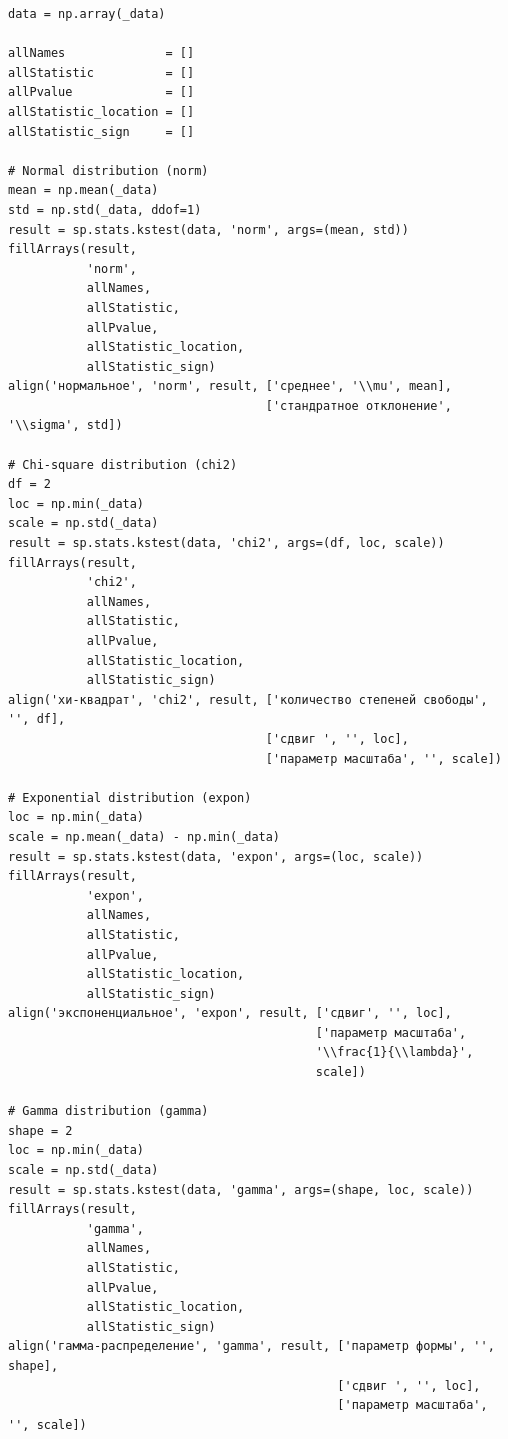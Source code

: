 \documentclass[a4paper, 14pt]{extarticle}
\begin{document}
\begin{lstlisting}[caption={Проведение теста Колмогорова-Смирнова на различных законах}, label={lst:12}]
data = np.array(_data)

allNames              = []
allStatistic          = []
allPvalue             = []
allStatistic_location = []
allStatistic_sign     = []

# Normal distribution (norm)
mean = np.mean(_data)
std = np.std(_data, ddof=1)
result = sp.stats.kstest(data, 'norm', args=(mean, std))
fillArrays(result, 
           'norm', 
           allNames, 
           allStatistic, 
           allPvalue, 
           allStatistic_location, 
           allStatistic_sign)
align('нормальное', 'norm', result, ['среднее', '\\mu', mean], 
                                    ['стандратное отклонение', '\\sigma', std])

# Chi-square distribution (chi2)
df = 2
loc = np.min(_data)
scale = np.std(_data)
result = sp.stats.kstest(data, 'chi2', args=(df, loc, scale))
fillArrays(result, 
           'chi2', 
           allNames, 
           allStatistic, 
           allPvalue, 
           allStatistic_location, 
           allStatistic_sign)
align('хи-квадрат', 'chi2', result, ['количество степеней свободы', '', df], 
                                    ['сдвиг ', '', loc],
                                    ['параметр масштаба', '', scale])

# Exponential distribution (expon)
loc = np.min(_data)
scale = np.mean(_data) - np.min(_data)
result = sp.stats.kstest(data, 'expon', args=(loc, scale))
fillArrays(result, 
           'expon', 
           allNames, 
           allStatistic, 
           allPvalue, 
           allStatistic_location, 
           allStatistic_sign)
align('экспоненциальное', 'expon', result, ['сдвиг', '', loc], 
                                           ['параметр масштаба', 
                                           '\\frac{1}{\\lambda}', 
                                           scale])

# Gamma distribution (gamma)
shape = 2
loc = np.min(_data)
scale = np.std(_data)
result = sp.stats.kstest(data, 'gamma', args=(shape, loc, scale))
fillArrays(result, 
           'gamma', 
           allNames, 
           allStatistic, 
           allPvalue, 
           allStatistic_location, 
           allStatistic_sign)
align('гамма-распределение', 'gamma', result, ['параметр формы', '', shape], 
                                              ['сдвиг ', '', loc],
                                              ['параметр масштаба', '', scale])


\end{lstlisting}
\end{document}
